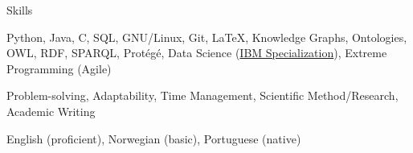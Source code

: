 %
\begin{rSection}{Skills}
    \begin{description}[nosep]
        \item[Technical:] Python, Java, C, SQL, GNU/Linux, Git, \LaTeX, Knowledge Graphs, Ontologies, OWL, RDF, SPARQL, Protégé, Data Science (\href{https://www.coursera.org/account/accomplishments/specialization/certificate/V45HAAHQS4AE}{IBM Specialization}), Extreme Programming (Agile)
        \item[Soft:] Problem-solving, Adaptability, Time Management, Scientific Method/Research, Academic Writing
        \item[Languages:] English (proficient), Norwegian (basic), Portuguese (native)
    \end{description}
    
\end{rSection}
